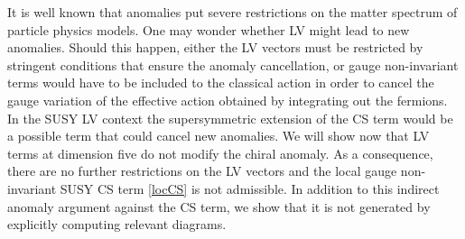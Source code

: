 \documentclass[12pt]{revtex4}
\begin{document}
It is well known that anomalies put severe restrictions on the matter
spectrum of particle physics models. One may wonder whether LV 
might lead to new anomalies. Should this happen, either the LV vectors
must be restricted by stringent conditions that ensure the 
anomaly cancellation, or gauge non-invariant terms would have to be
included to the classical action in order to cancel the gauge
variation of the effective action obtained by integrating out the
fermions. In the SUSY LV context the supersymmetric extension of the
CS term would be a possible term that could cancel new  
anomalies. We will show now that LV terms at dimension five
do not modify the chiral anomaly. As a consequence, there are no
further restrictions on the LV vectors and the 
local gauge non-invariant SUSY CS term \eqref{locCS} is not
admissible. In addition to this indirect anomaly argument against the
CS term, we show  that it is not
generated by explicitly computing relevant diagrams. 
\end{document}
